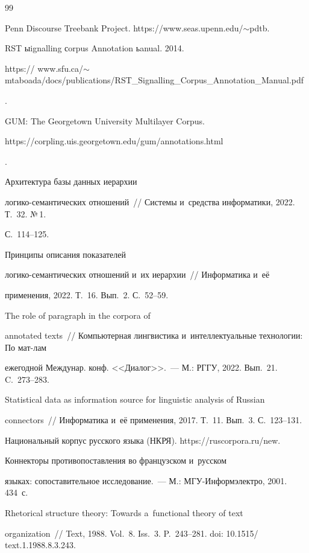 {{\begin{thebibliography}{99}


Penn Discourse Treebank Project. {\sf https://www.seas.upenn.edu/$\sim$pdtb.}




 RST ыignalling сorpus Annotation ьanual. 2014. {\sf 


https://  www.sfu.ca/$\sim$mtaboada/docs/publications/RST\_Signalling\_Corpus\_Annotation\_\linebreak Manual.pdf}.




GUM: The Georgetown University Multilayer Corpus. {\sf 


https://corpling.uis.\linebreak georgetown.edu/gum/annotations.html}.




 Архитектура базы данных иерархии 


логико-семантических отношений~/\!\!/ Системы и~средства информатики, 2022. Т.~32. №\,1. 


С.~114--125.




 Принципы описания показателей  


ло\-ги\-ко-се\-ман\-ти\-че\-ских отношений и~их иерархии~/\!\!/ Информатика и~её 


применения, 2022. Т.~16. Вып.~2. С.~52--59.




 The role of paragraph in the corpora of 


annotated texts~/\!\!/ Компьютерная лингвистика и~интеллектуальные технологии: По мат-лам 


ежегодной Междунар. конф. <<Диалог>>.~---  М.: РГГУ, 2022. Вып.~21. C.~273--283. 




 Statistical data as information source for linguistic analysis of Russian 


connectors~/\!\!/ Информатика и~её применения, 2017. Т.~11. Вып.~3. С.~123--131.




Национальный корпус русского языка (НКРЯ). {\sf https://ruscorpora.ru/new}.




 Коннекторы противопоставления во французском и~русском 


языках: сопоставительное исследование.~--- М.: МГУ-Информэлектро, 2001. 434~с.




 Rhetorical structure theory: Towards a~functional theory of text 


organization~/\!\!/ Text, 1988. Vol.~8. Iss.~3. P.~243--281. doi: 10.1515\!/ text.1.1988.8.3.243.


        \end{thebibliography}


} }
